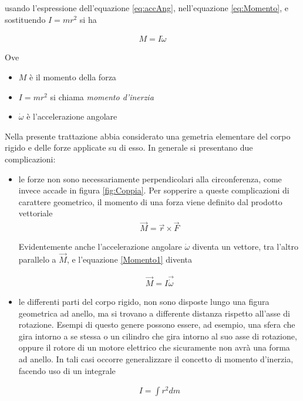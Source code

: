 \documentclass[17pt]{extarticle}
\begin{document}
usando l'espressione dell'equazione \ref{eq:accAng}, nell'equazione \ref{eq:Momento}, e sostituendo $I = mr^2$ si ha

\begin{eqnarray}\label{Momento1}
	M = I\dot{\omega}
\end{eqnarray}

Ove


\begin{itemize}
	\item $M$ è il momento della forza
	\item $I = mr^2$ si chiama \emph{momento d'inerzia}
	\item $\dot{\omega}$ è l'accelerazione angolare
\end{itemize}


Nella presente trattazione abbia considerato una gemetria elementare del corpo rigido e delle forze applicate su di esso. In generale si presentano due complicazioni: 

\begin{itemize}
	\item le forze non sono necessariamente perpendicolari alla circonferenza, come invece accade in figura \ref{fig:Coppia}. Per sopperire a queste complicazioni di carattere geometrico, il momento di una forza viene definito dal prodotto vettoriale
		\begin{eqnarray}
			\vec{M} = \vec{r}\times\vec{F} 	
		\end{eqnarray}
		
	Evidentemente anche l'accelerazione angolare $\dot{\omega}$ diventa un vettore, tra l'altro parallelo a $\vec{M}$, e l'equazione \ref{Momento1} diventa
	
		\begin{eqnarray}
			\vec{M} = I \vec{\dot{\omega}}
		\end{eqnarray}
	\item le differenti parti del corpo rigido, non sono disposte lungo una figura geometrica ad anello, ma si trovano a differente distanza rispetto all'asse di rotazione. Esempi di questo genere possono essere, ad esempio, una sfera che gira intorno a se stessa o un cilindro che gira intorno al suo asse di rotazione, oppure il rotore di un motore elettrico che sicuramente non avrà una forma ad anello. In tali casi occorre generalizzare il concetto di momento d'inerzia, facendo uso di un integrale

\begin{eqnarray}\label{eq:momInerzia}
	I = \int r^2dm
\end{eqnarray}	
	
\end{itemize}
\end{document}
